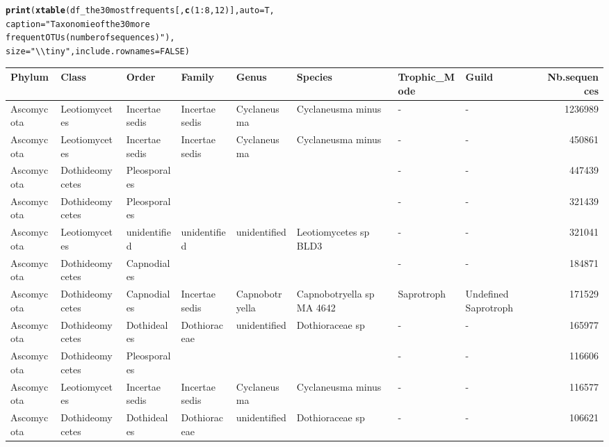 \documentclass[12pt]{article}\usepackage[]{graphicx}\usepackage[]{color}
\makeatletter
\newcommand{\hlnum}[1]{\textcolor[rgb]{0.686,0.059,0.569}{#1}}%
\newcommand{\hlstr}[1]{\textcolor[rgb]{0.192,0.494,0.8}{#1}}%
\newcommand{\hlopt}[1]{\textcolor[rgb]{0,0,0}{#1}}%
\newcommand{\hlstd}[1]{\textcolor[rgb]{0.345,0.345,0.345}{#1}}%
\newcommand{\hlkwc}[1]{\textcolor[rgb]{0.333,0.667,0.333}{#1}}%
\newcommand{\hlkwd}[1]{\textcolor[rgb]{0.737,0.353,0.396}{\textbf{#1}}}%
\newenvironment{kframe}{%
 \def\at@end@of@kframe{}%
 \ifinner\ifhmode%
  \def\at@end@of@kframe{\end{minipage}}%
  \begin{minipage}{\columnwidth}%
 \fi\fi%
 \def\FrameCommand##1{\hskip\@totalleftmargin \hskip-\fboxsep
 \colorbox{shadecolor}{##1}\hskip-\fboxsep
     \hskip-\linewidth \hskip-\@totalleftmargin \hskip\columnwidth}%
 \MakeFramed {\advance\hsize-\width
   \@totalleftmargin\z@ \linewidth\hsize
   \@setminipage}}%
 {\par\unskip\endMakeFramed%
 \at@end@of@kframe}
\numberwithin{figure}{section}
\makeatother
\begin{document}
\begin{landscape}
\begin{kframe}
\begin{alltt}
\hlkwd{print}\hlstd{(}\hlkwd{xtable}\hlstd{(df_the30mostfrequents[,} \hlkwd{c}\hlstd{(}\hlnum{1}\hlopt{:}\hlnum{8}\hlstd{,} \hlnum{12}\hlstd{)],} \hlkwc{auto} \hlstd{= T,}
             \hlkwc{caption} \hlstd{=} \hlstr{"Taxonomie of the 30 more
             frequent OTUs (number of sequences)"}\hlstd{),}
      \hlkwc{size} \hlstd{=} \hlstr{"\textbackslash{}\textbackslash{}tiny"}\hlstd{,} \hlkwc{include.rownames} \hlstd{=} \hlnum{FALSE}\hlstd{)}
\end{alltt}
\end{kframe}%
\begin{table}[ht]
\centering
\begingroup\tiny
\begin{tabular}{llllllllr}
  \hline
Phylum & Class & Order & Family & Genus & Species & Trophic\_Mode & Guild & Nb.sequences \\ 
  \hline
Ascomycota & Leotiomycetes & Incertae sedis & Incertae sedis & Cyclaneusma & Cyclaneusma minus & - & - & 1236989 \\ 
  Ascomycota & Leotiomycetes & Incertae sedis & Incertae sedis & Cyclaneusma & Cyclaneusma minus & - & - & 450861 \\ 
  Ascomycota & Dothideomycetes & Pleosporales &  &  &  & - & - & 447439 \\ 
  Ascomycota & Dothideomycetes & Pleosporales &  &  &  & - & - & 321439 \\ 
  Ascomycota & Leotiomycetes & unidentified & unidentified & unidentified & Leotiomycetes sp BLD3 & - & - & 321041 \\ 
  Ascomycota & Dothideomycetes & Capnodiales &  &  &  & - & - & 184871 \\ 
  Ascomycota & Dothideomycetes & Capnodiales & Incertae sedis & Capnobotryella & Capnobotryella sp MA 4642 & Saprotroph & Undefined Saprotroph & 171529 \\ 
  Ascomycota & Dothideomycetes & Dothideales & Dothioraceae & unidentified & Dothioraceae sp & - & - & 165977 \\ 
  Ascomycota & Dothideomycetes & Pleosporales &  &  &  & - & - & 116606 \\ 
  Ascomycota & Leotiomycetes & Incertae sedis & Incertae sedis & Cyclaneusma & Cyclaneusma minus & - & - & 116577 \\ 
  Ascomycota & Dothideomycetes & Dothideales & Dothioraceae & unidentified & Dothioraceae sp & - & - & 106621 \\ 

\end{tabular}
\end{table}
\end{landscape}
\end{document}
